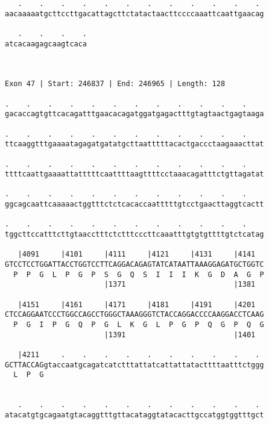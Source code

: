 \documentclass{article}
\begin{document}
\begin{Verbatim}
   .    .    .    .    .    .    .    .    .    .    .    . 
aacaaaaatgcttccttgacattagcttctatactaacttccccaaattcaattgaacag
                                                            
   .    .    .    .
atcacaagagcaagtcaca
                   
                   
 
Exon 47 | Start: 246837 | End: 246965 | Length: 128
 
.    .    .    .    .    .    .    .    .    .    .    .    
gacaccagtgttcacagatttgaacacagatggatgagactttgtagtaactgagtaaga
                                                            
.    .    .    .    .    .    .    .    .    .    .    .    
ttcaaggtttgaaaatagagatgatatgcttaatttttacactgaccctaagaaacttat
                                                            
.    .    .    .    .    .    .    .    .    .    .    .    
ttttcaattgaaaattatttttcaattttaagttttcctaaacagatttctgttagatat
                                                            
.    .    .    .    .    .    .    .    .    .    .    .    
ggcagcaattcaaaaactggtttctctcacaccaatttttgtcctgaacttaggtcactt
                                                            
.    .    .    .    .    .    .    .    .    .    .    .    
tggcttccatttcttgtaacctttctctttcccttcaaatttgtgtgttttgtctcatag
                                                            
   |4091     |4101     |4111     |4121     |4131     |4141  
GTCCTCCTGGATTACCTGGTCCTTCAGGACAGAGTATCATAATTAAAGGAGATGCTGGTC
  P  P  G  L  P  G  P  S  G  Q  S  I  I  I  K  G  D  A  G  P
                       |1371                         |1381  
  
   |4151     |4161     |4171     |4181     |4191     |4201  
CTCCAGGAATCCCTGGCCAGCCTGGGCTAAAGGGTCTACCAGGACCCCAAGGACCTCAAG
  P  G  I  P  G  Q  P  G  L  K  G  L  P  G  P  Q  G  P  Q  G
                       |1391                         |1401  
  
   |4211     .    .    .    .    .    .    .    .    .    . 
GCTTACCAGgtaccaatgcagatcatctttattatcattattatacttttaatttctggg
  L  P  G                                                   
                                                            
  
   .    .    .    .    .    .    .    .    .    .    .    . 
atacatgtgcagaatgtacaggtttgttacataggtatacacttgccatggtggtttgct
                                                            

\end{Verbatim}
\end{document}
